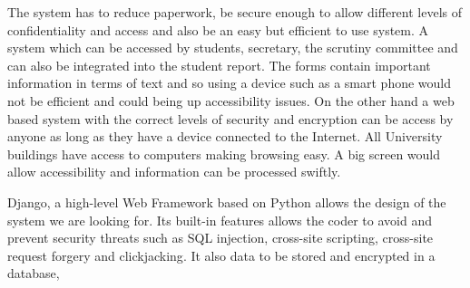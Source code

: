 \documentclass[../main.tex]{subfiles}
\begin{document}
\raggedright
The system has to reduce paperwork, be secure enough to allow different levels of confidentiality and access and also be an easy but efficient to use system. A system which can be accessed by students, secretary, the scrutiny committee and can also be integrated into the student report. The forms contain important information in terms of text and so using a device such as a smart phone would not be efficient and could being up accessibility issues. On the other hand a web based system with the correct levels of security and encryption can be access by anyone as long as they have a device connected to the Internet. All University buildings have access to computers making browsing easy. A big screen would allow accessibility and information can be processed swiftly.

Django\cite{django}, a high-level Web Framework based on Python allows the design of the system we are looking for. Its built-in features allows the coder to avoid and prevent security threats such as SQL injection, cross-site scripting, cross-site request forgery and clickjacking\cite{django}. It also data to be stored and encrypted in a database, 
\end{document}
